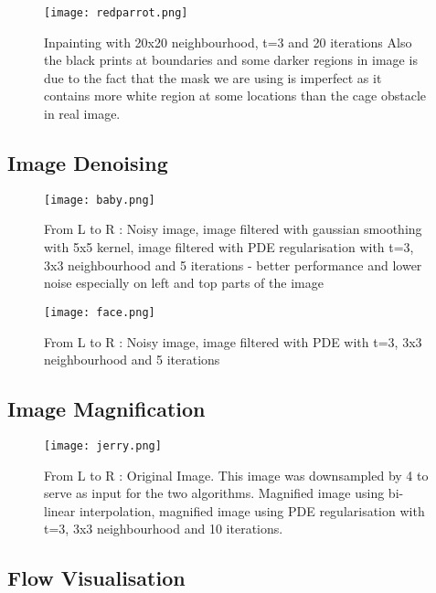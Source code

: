 \documentclass[a4paper]{article}
\begin{document}
\begin{figure}[H]
\centering
\texttt{[image: redparrot.png]}
\caption{\label{fig:data} Inpainting with 20x20 neighbourhood, t=3 and 20 iterations Also the black prints at boundaries and some darker regions in image is due to the fact that the mask we are using is imperfect as it contains more white region at some locations than the cage obstacle in real image.}
\end{figure}

\pagebreak
\subsection{Image Denoising}


\begin{figure}[h]
\centering
\texttt{[image: baby.png]}
\caption{\label{fig:data} From L to R : Noisy image, image filtered with gaussian smoothing with 5x5 kernel, image filtered with PDE regularisation with t=3, 3x3 neighbourhood and 5 iterations - better performance and lower noise especially on left and top parts of the image }
\end{figure}

\begin{figure}[h]
\centering
\texttt{[image: face.png]}
\caption{\label{fig:data} From L to R : Noisy image, image filtered with PDE with t=3, 3x3 neighbourhood and 5 iterations }
\end{figure}

\subsection{Image Magnification}

\begin{figure}[H]
\centering
\texttt{[image: jerry.png]}
\caption{\label{fig:data}
    From L to R : Original Image. This image was downsampled by 4 to serve as input for the two algorithms. Magnified image using bi-linear interpolation, magnified image using PDE regularisation with t=3, 3x3 neighbourhood and 10 iterations. 
}

\end{figure}

\pagebreak

\subsection{Flow Visualisation}
\end{document}
